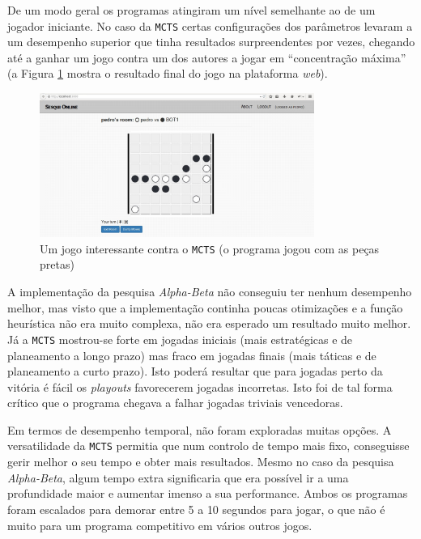 \documentclass[12pt,a4paper,oneside]{article}
\begin{document}
De um modo geral os programas atingiram um nível semelhante ao de um
jogador iniciante. No caso da \texttt{MCTS} certas configurações dos
parâmetros levaram a um desempenho superior que tinha resultados
surpreendentes por vezes, chegando até a ganhar um jogo contra um dos
autores a jogar em ``concentração máxima'' (a Figura \ref{fig:mctswin}
mostra o resultado final do jogo na plataforma \textit{web}).

\begin{figure}[!htb]
  \centering
  \includegraphics[width=0.8\textwidth]{sesqui_win}
  \caption{Um jogo interessante contra o \texttt{MCTS} (o programa jogou com as peças pretas)}
  \label{fig:mctswin}
\end{figure}

A implementação da pesquisa \textit{Alpha-Beta} não conseguiu ter nenhum
desempenho melhor, mas visto que a implementação continha poucas
otimizações e a função heurística não era muito complexa, não era
esperado um resultado muito melhor. Já a \texttt{MCTS} mostrou-se
forte em jogadas iniciais (mais estratégicas e de planeamento a longo
prazo) mas fraco em jogadas finais (mais táticas e de planeamento a
curto prazo). Isto poderá resultar que para jogadas perto da vitória é
fácil os \textit{playouts} favorecerem jogadas incorretas. Isto foi de
tal forma crítico que o programa chegava a falhar jogadas triviais
vencedoras.

Em termos de desempenho temporal, não foram exploradas muitas
opções. A versatilidade da \texttt{MCTS} permitia que num controlo de
tempo mais fixo, conseguisse gerir melhor o seu tempo e obter mais
resultados. Mesmo no caso da pesquisa \textit{Alpha-Beta}, algum tempo
extra significaria que era possível ir a uma profundidade maior e
aumentar imenso a sua performance. Ambos os programas foram escalados
para demorar entre 5 a 10 segundos para jogar, o que não é muito para
um programa competitivo em vários outros jogos.

\end{document}
